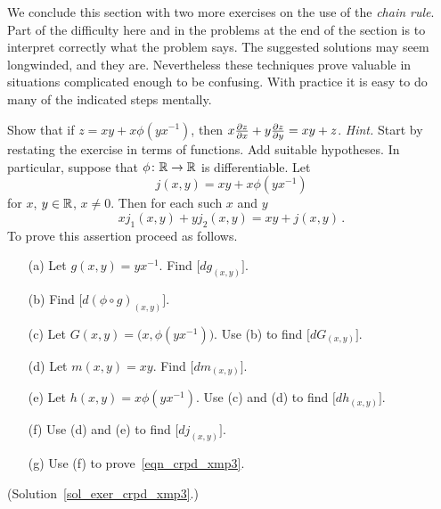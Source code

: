 We conclude this section with two more exercises on the use of the \emph{chain rule}.  Part of
the difficulty here and in the problems at the end of the section is to interpret correctly
what the problem says.  The suggested solutions may seem longwinded, and they are.
Nevertheless these techniques prove valuable in situations complicated enough to be confusing.
With practice it is easy to do many of the indicated steps mentally.

\begin{exer}\label{exer_crpd_xmp3}  Show that if $z = xy + x\phi(yx^{-1})$, then $x \frac{\partial z}{\partial x} +
y \frac{\partial z}{\partial y} = xy + z$. \emph{Hint.} Start by restating the exercise in terms of functions.  Add
suitable hypotheses.  In particular, suppose that $\phi \colon \mathbb{R} \rightarrow \mathbb{R}$ is differentiable.
Let
  \[ j(x,y) = xy + x\phi(yx^{-1}) \]
for $x$, $y \in \mathbb{R}$, $x \ne 0$.  Then for each such $x$ and $y$
  \begin{equation}\label{eqn_crpd_xmp3}
      xj_1(x,y) + yj_2(x,y) = xy + j(x,y)\,.
  \end{equation}
To prove this assertion proceed as follows.
 \begin{enumerate}
  \item[(a)] Let $g(x,y) = yx^{-1}$.  Find $\bigl[dg_{(x,y)}\bigr]$.
  \item[(b)] Find $\bigl[d(\phi \circ g)_{(x,y)}\bigr]$.
  \item[(c)] Let $G(x,y) = \bigl(x,\phi(yx^{-1})\bigr)$.  Use (b) to find
$\bigl[dG_{(x,y)}\bigr]$.
  \item[(d)] Let $m(x,y) = xy$. Find $\bigl[dm_{(x,y)}\bigr]$.
  \item[(e)] Let $h(x,y) = x\phi(yx^{-1})$.  Use (c) and (d) to find $\bigl[dh_{(x,y)}\bigr]$.
  \item[(f)] Use (d) and (e) to find $\bigl[dj_{(x,y)}\bigr]$.
  \item[(g)] Use (f) to prove~\eqref{eqn_crpd_xmp3}.
 \end{enumerate}
(Solution~\ref{sol_exer_crpd_xmp3}.)
\end{exer}

